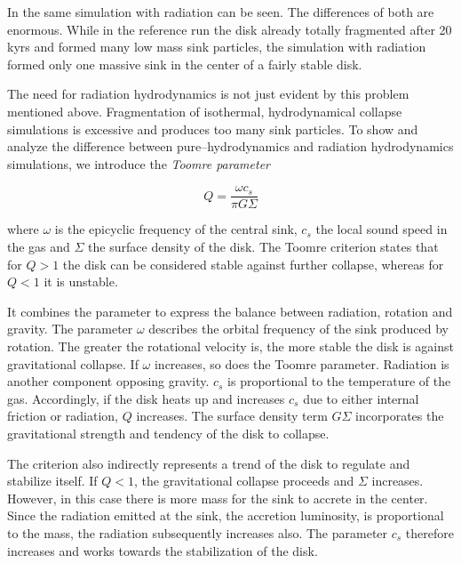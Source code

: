 In  the same simulation with radiation can be seen.
The differences of both are enormous.
While in the reference run the disk already totally fragmented after 20 kyrs and formed many low mass sink particles, the simulation with radiation formed only one massive sink in the center of a fairly stable disk.

The need for radiation hydrodynamics is not just evident by this problem mentioned above.
Fragmentation of isothermal, hydrodynamical collapse simulations is excessive and produces too many sink particles.
To show and analyze the difference between pure--hydrodynamics and radiation hydrodynamics simulations, we introduce the \textit{Toomre parameter}

\begin{equation}
  Q = \frac{\omega c_{s}}{\pi G\Sigma}
\end{equation}

where $\omega$ is the epicyclic frequency of the central sink, $c_{s}$ the local sound speed in the gas and $\Sigma$ the surface density of the disk.
The Toomre criterion states that for $Q>1$ the disk can be considered stable against further collapse, whereas for $Q<1$ it is unstable.

It combines the parameter to express the balance between radiation, rotation and gravity.
The parameter $\omega$ describes the orbital frequency of the sink produced by rotation.
The greater the rotational velocity is, the more stable the disk is against gravitational collapse.
If $\omega$ increases, so does the Toomre parameter.
Radiation is another component opposing gravity.
$c_{s}$ is proportional to the temperature of the gas.
Accordingly, if the disk heats up and increases $c_{s}$ due to either internal friction or radiation, $Q$ increases.
The surface density term $G\Sigma$ incorporates the gravitational strength and tendency of the disk to collapse.

The criterion also indirectly represents a trend of the disk to regulate and stabilize itself.
If $Q<1$, the gravitational collapse proceeds and $\Sigma$ increases.
However, in this case there is more mass for the sink to accrete in the center.
Since the radiation emitted at the sink, the accretion luminosity, is proportional to the mass, the radiation subsequently increases also.
The parameter $c_{s}$ therefore increases and works towards the stabilization of the disk.

